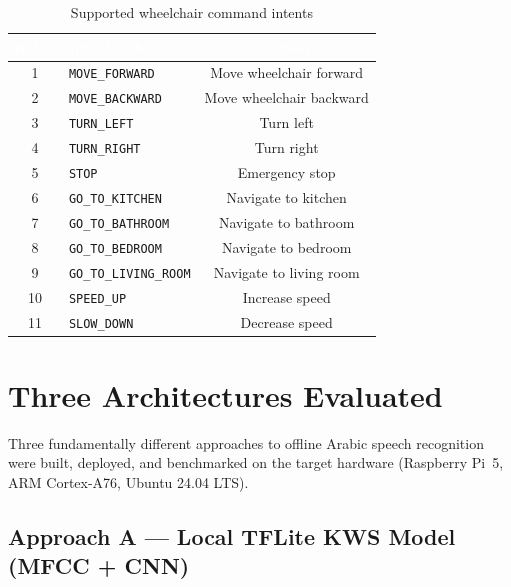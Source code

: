 \documentclass[12pt, a4paper]{report}
\newcommand{\thead}[1]{%
  \cellcolor{tableheader}\textcolor{white}{\textbf{#1}}}
\newcommand{\trow}[1]{\rowcolor{rowalt}#1}
\begin{document}
\begin{table}[h!]
\centering
\caption{Supported wheelchair command intents}
\label{tab:intents}
\begin{tabular}{clc}
\toprule
\thead{Index} & \thead{Intent Label} & \thead{Action} \\
\midrule
\trow{1}  & \texttt{MOVE\_FORWARD}    & Move wheelchair forward \\
2         & \texttt{MOVE\_BACKWARD}   & Move wheelchair backward \\
\trow{3}  & \texttt{TURN\_LEFT}       & Turn left \\
4         & \texttt{TURN\_RIGHT}      & Turn right \\
\trow{5}  & \texttt{STOP}             & Emergency stop \\
6         & \texttt{GO\_TO\_KITCHEN}  & Navigate to kitchen \\
\trow{7}  & \texttt{GO\_TO\_BATHROOM} & Navigate to bathroom \\
8         & \texttt{GO\_TO\_BEDROOM}  & Navigate to bedroom \\
\trow{9}  & \texttt{GO\_TO\_LIVING\_ROOM} & Navigate to living room \\
10        & \texttt{SPEED\_UP}        & Increase speed \\
\trow{11} & \texttt{SLOW\_DOWN}       & Decrease speed \\
\bottomrule
\end{tabular}
\end{table}

\chapter{Three Architectures Evaluated}

Three fundamentally different approaches to offline Arabic speech recognition were
built, deployed, and benchmarked on the target hardware (Raspberry Pi~5,
ARM Cortex-A76, Ubuntu 24.04 LTS).

\section{Approach A --- Local TFLite KWS Model (MFCC + CNN)}
\end{document}
